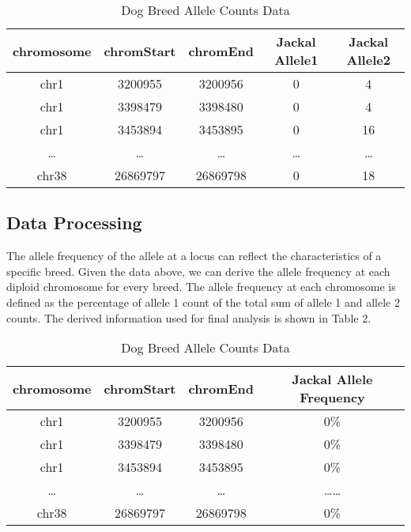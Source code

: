 \documentclass{article} %
\begin{document}
\begin{table}[H]
\caption{Dog Breed Allele Counts Data}
\label{sample-table}
\begin{center}
\begin{tabular}{|c|c|c|c|c|}
\hline
chromosome & chromStart & chromEnd & Jackal Allele1 & Jackal Allele2 \\ \hline
chr1       & 3200955    & 3200956  & 0              & 4              \\ \hline
chr1       & 3398479    & 3398480  & 0              & 4              \\ \hline
chr1       & 3453894    & 3453895  & 0              & 16             \\ \hline
\ldots       & \ldots    & \ldots  & \ldots              & \ldots             \\ \hline
chr38       & 26869797    & 26869798  & 0              & 18        \\ \hline
\end{tabular}
\end{center}
\end{table}

\subsection{Data Processing}

The allele frequency of the allele at a locus can reflect the characteristics of a specific breed. Given the data above, we can derive the allele frequency at each diploid chromosome for every breed. The allele frequency at each chromosome is defined as the percentage of allele 1 count of the total sum of allele 1 and allele 2 counts. The derived information used for final analysis is shown in Table 2.

\begin{table}[H]
\caption{Dog Breed Allele Counts Data}
\label{sample-table}
\begin{center}
\begin{tabular}{|c|c|c|c|}
\hline
chromosome & chromStart & chromEnd & Jackal Allele Frequency \\ \hline
chr1       & 3200955    & 3200956  & 0\% \\ \hline
chr1       & 3398479    & 3398480  & 0\% \\ \hline
chr1       & 3453894    & 3453895  & 0\% \\ \hline
\ldots       & \ldots    & \ldots  & \ldots \ldots             \\ \hline
chr38       & 26869797    & 26869798  & 0\% \\ \hline
\end{tabular}
\end{center}
\end{table}
\end{document}
